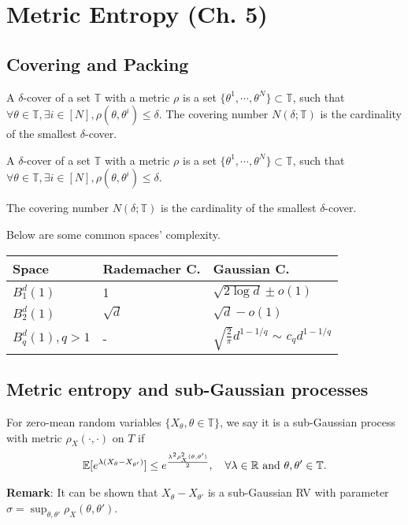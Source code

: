 \section{Metric Entropy (Ch. 5)}

\subsection{Covering and Packing}
\begin{definition}
A $\delta$-cover of a set $\mathbb{T}$ with a metric $\rho$ is a set $\{ \theta^1, \cdots, \theta^N \} \subset \mathbb{T} $, such that $\forall \theta \in \mathbb{T}, \exists i \in [N], \rho(\theta, \theta^i) \leq \delta$.
The covering number $N(\delta; \mathbb{T})$ is the cardinality of the smallest $\delta$-cover.
\end{definition}

\begin{definition}
A $\delta$-cover of a set $\mathbb{T}$ with a metric $\rho$ is a set $\{ \theta^1, \cdots, \theta^N \} \subset \mathbb{T} $, such that $\forall \theta \in \mathbb{T}, \exists i \in [N], \rho(\theta, \theta^i) \leq \delta$.

The covering number $N(\delta; \mathbb{T})$ is the cardinality of the smallest $\delta$-cover.
\end{definition}

Below are some common spaces' complexity.
 \begin{center}
    \centering
    \begin{tabular}{lll}
    \toprule
        Space & Rademacher C. & Gaussian C.\\
        \midrule
        $B_1^d(1)$ & 1 & $\sqrt{2 \log d} \pm o(1)$ \\
        $B_2^d(1)$ & $\sqrt{d}$ & $\sqrt{d} - o(1) $ \\
         $B^d_q(1), q>1$ & -  & $\sqrt{\frac{2}{\pi}} d^{1-1/q}$ $\sim$ $c_q d^{1-1/q}$\\
         \bottomrule
    \end{tabular}
 \end{center}

\subsection{Metric entropy and sub-Gaussian processes}
\begin{definition}
For zero-mean random variables $\{X_\theta, \theta \in \mathbb{T}\}$, we say it is a sub-Gaussian process with metric $\rho_X(\cdot, \cdot)$ on $T$ if 
\begin{align*}
    \mathbb{E}[e^{\lambda (X_\theta - X_{\theta'})}] \leq e^{\frac{\lambda^2 \rho^2_X(\theta, \theta')}{2}}, \quad \forall \lambda \in \mathbb{R} \text{ and } \theta, \theta' \in \mathbb{T}.
\end{align*}
\end{definition}
\textbf{Remark}: It can be shown that $X_\theta - X_{\theta'}$ is a sub-Gaussian RV with parameter $\sigma = \sup_{\theta, \theta'} \rho_X(\theta, \theta')$.

